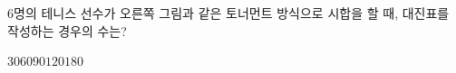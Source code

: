 \hspace*{2mm}\begin{minipage}[t]{\dimexpr\linewidth-2mm\relax}\vspace{0pt}
\noindent\begin{minipage}[t]{0.58\linewidth}\vspace{0pt}\raggedright $6$명의 테니스 선수가 오른쪽 그림과 같은 토너먼트 방식으로 시합을 할 때, 대진표를 작성하는 경우의 수는?\end{minipage}\hfill\begin{minipage}[t]{0.4\linewidth}\vspace{0pt}\centering \resizebox{\ifdim\width>\linewidth\linewidth\else\width\fi}{!}{}\end{minipage}\par
\begin{choices32}{$30$}{$60$}{$90$}{$120$}{$180$}\end{choices32}\end{minipage}
